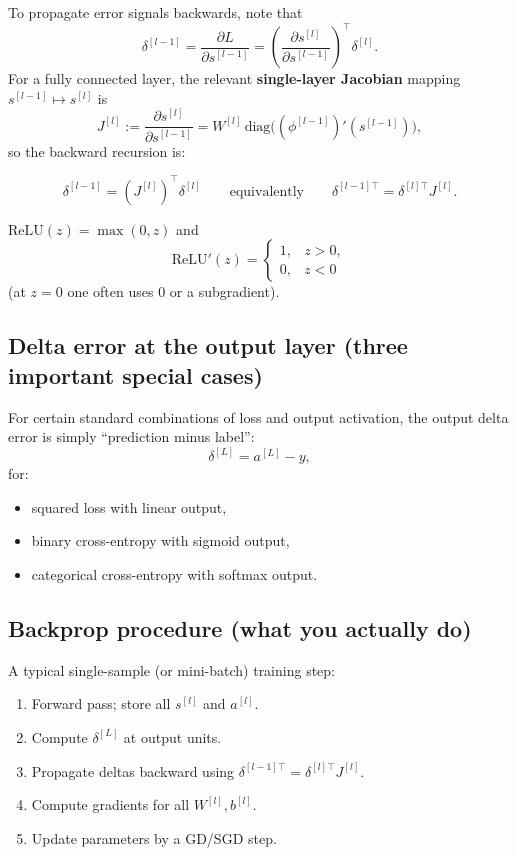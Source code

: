 \documentclass[11pt, oneside]{book}
\newcommand{\1}{\ind}                       %
\begin{document}
To propagate error signals backwards, note that
\[
\delta^{[l-1]} = \frac{\partial L}{\partial s^{[l-1]}}
= \left(\frac{\partial s^{[l]}}{\partial s^{[l-1]}}\right)^\top \delta^{[l]}.
\]
For a fully connected layer, the relevant \textbf{single-layer Jacobian} mapping $s^{[l-1]}\mapsto s^{[l]}$ is
\[
J^{[l]} := \frac{\partial s^{[l]}}{\partial s^{[l-1]}}
= W^{[l]}\,\mathrm{diag}\!\Big((\phi^{[l-1]})'(s^{[l-1]})\Big),
\]
so the backward recursion is:

\begin{thmbox}[title={Backpropagation Backward Recursion}]
\[
\delta^{[l-1]} = (J^{[l]})^\top \delta^{[l]}
\qquad\text{equivalently}\qquad
\delta^{[l-1]\top} = \delta^{[l]\top} J^{[l]}.
\]
\end{thmbox}

\begin{notebox}[title={ReLU Derivative}]
$\mathrm{ReLU}(z)=\max(0,z)$ and
\[
\mathrm{ReLU}'(z)=
\begin{cases}
1,& z>0,\\
0,& z<0
\end{cases}
\]
(at $z=0$ one often uses $0$ or a subgradient).
\end{notebox}

\subsection{Delta error at the output layer (three important special cases)}
For certain standard combinations of loss and output activation, the output delta error is simply ``prediction minus label'':
\[
\delta^{[L]} = a^{[L]} - y,
\]
for:
\begin{itemize}
  \item squared loss with linear output,
  \item binary cross-entropy with sigmoid output,
  \item categorical cross-entropy with softmax output.
\end{itemize}

\subsection{Backprop procedure (what you actually do)}
A typical single-sample (or mini-batch) training step:
\begin{enumerate}
  \item Forward pass; store all $s^{[l]}$ and $a^{[l]}$.
  \item Compute $\delta^{[L]}$ at output units.
  \item Propagate deltas backward using $\delta^{[l-1]\top}=\delta^{[l]\top}J^{[l]}$.
  \item Compute gradients for all $W^{[l]},b^{[l]}$.
  \item Update parameters by a GD/SGD step.
\end{enumerate}
\end{document}

